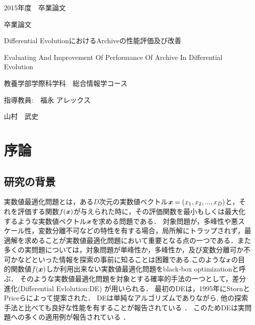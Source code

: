 \documentclass[a4paper,11pt,oneside,openany]{jsbook}
\def\vector#1{\mbox{\boldmath $#1$}}
\begin{document}
\thispagestyle{empty}
2015年度　卒業論文%
\bigskip%
\LARGE%
\begin{center}
卒業論文
\end{center}
\bigskip\bigskip\bigskip\bigskip\bigskip\bigskip\bigskip %
\begin{center} %
Differential EvolutionにおけるArchiveの性能評価及び改善
\end{center}
\large %
\begin{center}
Evaluating And Improvement Of Performance Of Archive In Differential Evolution
\end{center}
\bigskip\bigskip\bigskip\bigskip\bigskip\bigskip\bigskip\bigskip\bigskip\bigskip
\bigskip\bigskip\bigskip\bigskip\bigskip\bigskip\bigskip\bigskip\bigskip
\Large %
\begin{center}
教養学部学際科学科　総合情報学コース
\end{center}
\Large %
\begin{center}
指導教員:　福永 アレックス
\end{center}
\LARGE %
\begin{center}
山村　武史
\end{center}
\normalsize
\thispagestyle{empty}
\tableofcontents

\chapter{序論}
\section{研究の背景}
実数値最適化問題とは，ある$D$次元の実数値ベクトル$\vector{x} = (x_1, x_2, ..., x_D)$と，それを評価する関数$f(\vector{x})$が与えられた時に，その評価関数を最小もしくは最大化するような実数値ベクトル$\vector{x}$を求める問題である．
対象問題が，多峰性や悪スケール性，変数分離不可などの特性を有する場合，局所解にトラップされず，最適解を求めることが実数値最適化問題において重要となる点の一つである．また多くの実問題については，対象問題が単峰性か，多峰性か，及び変数分離可か不可かなどといった情報を探索の事前に知ることは困難である.このような$\vector{x}$の目的関数値$f(\vector{x})$しか利用出来ない実数値最適化問題をblack-box optimizationと呼ぶ．
そのような実数値最適化問題を対象とする確率的手法の一つとして，差分進化(Differential Evlolution:DE) \cite{Storn} が用いられる．
最初のDEは，1995年にStornとPriceらによって提案された．
DEは単純なアルゴリズムでありながら, 他の探索手法と比べても良好な性能を有することが報告されている
． \cite{Storn} \cite{ExDE}
このためDEは実問題への多くの適用例が報告されている \cite{ExDE} ．
\end{document}
